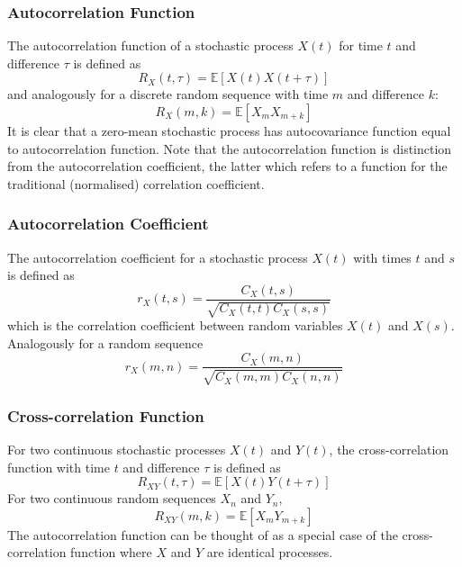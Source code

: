 \documentclass[11pt]{report} %
\begin{document}
\subsubsection{Autocorrelation Function}

The autocorrelation function of a stochastic process $X\left(t\right)$ for time $t$ and difference $\tau$ is defined as
\begin{equation}
R_{X}\left(t, \tau\right) = \mathbb{E}\left[X\left(t\right)X\left(t+\tau\right)\right]
\end{equation}
and analogously for a discrete random sequence with time $m$ and difference $k$:
\begin{equation}
R_{X}\left(m, k\right) =  \mathbb{E}\left[X_{m}X_{m + k}\right]
\end{equation}
It is clear that a zero-mean stochastic process has autocovariance function equal to autocorrelation function. Note that the autocorrelation function is distinction from the autocorrelation coefficient, the latter which refers to a function for the traditional (normalised) correlation coefficient.

\subsubsection{Autocorrelation Coefficient}

The autocorrelation coefficient for a stochastic process $X\left(t\right)$ with times $t$ and $s$ is defined as
\begin{equation}
r_{X}\left(t, s\right) = \dfrac{C_{X}\left(t, s\right)}{\sqrt{C_{X}\left(t, t\right)C_{X}\left(s, s\right)}}
\end{equation}
which is the correlation coefficient between random variables $X\left(t\right)$ and $X\left(s\right)$. Analogously for a random sequence
\begin{equation}
r_{X}\left(m, n\right) = \dfrac{C_{X}\left(m, n\right)}{\sqrt{C_{X}\left(m, m\right)C_{X}\left(n, n\right)}}
\end{equation}

\subsubsection{Cross-correlation Function}

For two continuous stochastic processes $X\left(t\right)$ and $Y\left(t\right)$, the cross-correlation function with time $t$ and difference $\tau$ is defined as
\begin{equation}
R_{XY}\left(t, \tau\right) = \mathbb{E}\left[X\left(t\right)Y\left(t + \tau\right)\right]
\end{equation}
For two continuous random sequences $X_{n}$ and $Y_{n}$,
\begin{equation}
R_{XY}\left(m, k\right) = \mathbb{E}\left[X_{m}Y_{m + k}\right]
\end{equation}
The autocorrelation function can be thought of as a special case of the cross-correlation function where $X$ and $Y$ are identical processes.
\end{document}
